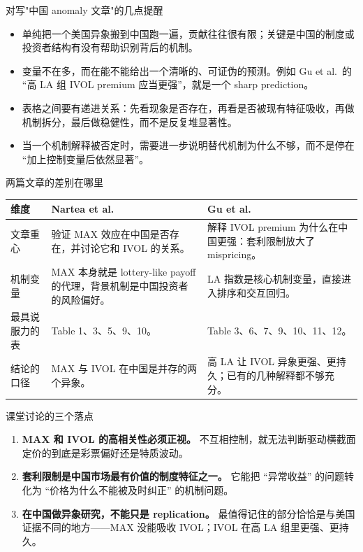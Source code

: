 \documentclass[aspectratio=169,10pt]{beamer}
\newcommand{\tighttable}{\scriptsize\setlength{\tabcolsep}{3pt}\renewcommand{\arraystretch}{1.12}}
\begin{document}
\begin{frame}{对写"中国 anomaly 文章"的几点提醒}
	\begin{itemize}
		\item 单纯把一个美国异象搬到中国跑一遍，贡献往往很有限；关键是中国的制度或投资者结构有没有帮助识别背后的机制。
		\item 变量不在多，而在能不能给出一个清晰的、可证伪的预测。例如 Gu et al.\ 的 ``高 LA 组 IVOL premium 应当更强''，就是一个 sharp prediction。
		\item 表格之间要有递进关系：先看现象是否存在，再看是否被现有特征吸收，再做机制拆分，最后做稳健性，而不是反复堆显著性。
		\item 当一个机制解释被否定时，需要进一步说明替代机制为什么不够，而不是停在 ``加上控制变量后依然显著''。
	\end{itemize}
\end{frame}

\begin{frame}[c]{两篇文章的差别在哪里}
	\tighttable
	\begin{tabularx}{\textwidth}{lYY}
		\toprule
		维度 & Nartea et al. & Gu et al.\\
		\midrule
		文章重心 & 验证 MAX 效应在中国是否存在，并讨论它和 IVOL 的关系。 & 解释 IVOL premium 为什么在中国更强：套利限制放大了 mispricing。\\
		机制变量 & MAX 本身就是 lottery-like payoff 的代理，背景机制是中国投资者的风险偏好。 & LA 指数是核心机制变量，直接进入排序和交互回归。\\
		最具说服力的表 & Table 1、3、5、9、10。 & Table 3、6、7、9、10、11、12。\\
		结论的口径 & MAX 与 IVOL 在中国是并存的两个异象。 & 高 LA 让 IVOL 异象更强、更持久；已有的几种解释都不够充分。\\
		\bottomrule
	\end{tabularx}
\end{frame}

\begin{frame}{课堂讨论的三个落点}
	\begin{enumerate}
		\item \textbf{MAX 和 IVOL 的高相关性必须正视。} 不互相控制，就无法判断驱动横截面定价的到底是彩票偏好还是特质波动。
		\item \textbf{套利限制是中国市场最有价值的制度特征之一。} 它能把 ``异常收益'' 的问题转化为 ``价格为什么不能被及时纠正'' 的机制问题。
		\item \textbf{在中国做异象研究，不能只是 replication。} 最值得记住的部分恰恰是与美国证据不同的地方——MAX 没能吸收 IVOL；IVOL 在高 LA 组里更强、更持久。
	\end{enumerate}
\end{frame}
\end{document}
